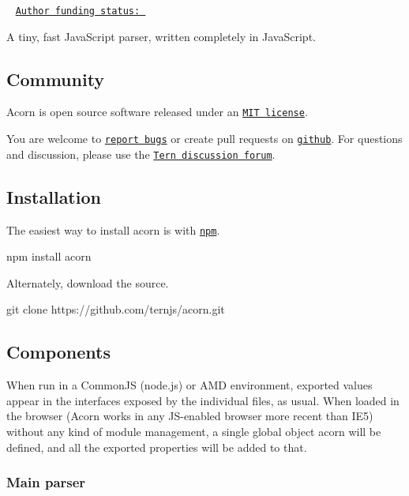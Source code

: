 \href{https://travis-ci.org/ternjs/acorn}{\tt } \href{https://www.npmjs.com/package/acorn}{\tt } \href{https://cdnjs.com/libraries/acorn}{\tt } ~\newline
\href{https://marijnhaverbeke.nl/fund/}{\tt Author funding status\+: }

A tiny, fast Java\+Script parser, written completely in Java\+Script.

\subsection*{Community}

Acorn is open source software released under an \href{https://github.com/ternjs/acorn/blob/master/LICENSE}{\tt M\+IT license}.

You are welcome to \href{https://github.com/ternjs/acorn/issues}{\tt report bugs} or create pull requests on \href{https://github.com/ternjs/acorn}{\tt github}. For questions and discussion, please use the \href{https://discuss.ternjs.net}{\tt Tern discussion forum}.

\subsection*{Installation}

The easiest way to install acorn is with \href{https://www.npmjs.com/}{\tt {\ttfamily npm}}.


\begin{DoxyCode}
npm install acorn
\end{DoxyCode}


Alternately, download the source.


\begin{DoxyCode}
git clone https://github.com/ternjs/acorn.git
\end{DoxyCode}


\subsection*{Components}

When run in a Common\+JS (node.\+js) or A\+MD environment, exported values appear in the interfaces exposed by the individual files, as usual. When loaded in the browser (Acorn works in any J\+S-\/enabled browser more recent than I\+E5) without any kind of module management, a single global object {\ttfamily acorn} will be defined, and all the exported properties will be added to that.

\subsubsection*{Main parser}


